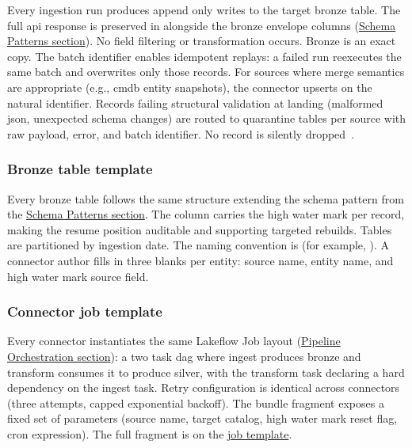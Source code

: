 Every ingestion run produces append only writes to the target bronze table. The full \gls{api} response is preserved in  alongside the bronze envelope columns (\hyperref[sec:schema-patterns]{Schema Patterns section}). No field filtering or transformation occurs. Bronze is an exact copy. The batch identifier enables idempotent replays: a failed run reexecutes the same batch and overwrites only those records. For sources where merge semantics are appropriate (e.g., \gls{cmdb} entity snapshots), the connector upserts on the natural identifier. Records failing structural validation at landing (malformed \gls{json}, unexpected schema changes) are routed to quarantine tables per source with raw payload, error, and batch identifier. No record is silently dropped~\cite{DAMA2017,Reis2022}.

\subsubsection{Bronze table template}

Every bronze table follows the same structure extending the schema pattern from the \hyperref[sec:schema-patterns]{Schema Patterns section}. The  column carries the high water mark per record, making the resume position auditable and supporting targeted rebuilds. Tables are partitioned by ingestion date. The naming convention is  (for example, ). A connector author fills in three blanks per entity: source name, entity name, and high water mark source field.

\subsubsection{Connector job template}

Every connector instantiates the same Lakeflow Job layout (\hyperref[sec:orchestration]{Pipeline Orchestration section}): a two task \gls{dag} where ingest produces bronze and transform consumes it to produce silver, with the transform task declaring a hard dependency on the ingest task. Retry configuration is identical across connectors (three attempts, capped exponential backoff). The bundle fragment exposes a fixed set of parameters (source name, target catalog, high water mark reset flag, cron expression). The full fragment is on the \href{https://vkraus.github.io/appsec-mvp/platform/reference/connector-job-template/}{job template}.

